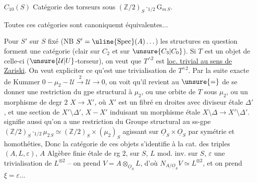 $C_{10}(S)$ Catégorie des torseurs sous $(\mathbb Z/2)_S\mathbin{\cdot}_{1/2}\mathrm G_{m\,S}$.

 Toutes ces catégories sont canoniquemt équivalentes...

 Pour $S'$ sur $S$ fixé (NB $S'=\uline{\operatorname{Spec}}(A)\ldots$) les structures en question forment une  catégorie (clair sur $C_2$ et sur $\unsure{C_3|C_0}$). Si $T$ est un objet de celle-ci ($\unsure{\mathcal U|U}$-torseur), on veut que $T^{\wedge 2}$ est \uline{loc. trivial au sens de Zariski}.
 On veut expliciter ce qu'est une trivialisation de $T^{\wedge 2}$. Par la suite exacte de Kummer $0-\mu_2-\mathcal U\xrightarrow{2}\mathcal U\longrightarrow 0$, on voit qu'il revient au $\unsure{=}$ de se donner une restriction du gpe structural à $\mu_2$, ou une orbite  de $T$ sous $\mu_2$, ou un morphisme de degr $2$ $X\longrightarrow X'$, où $X'$ est un fibré en droites avec diviseur  étale $\Delta'$, et une section  de $X'\setminus\Delta'$, $X-X'$ induisant un morphisme  étale
 $X\setminus\Delta\longrightarrow X'\setminus\Delta'$.  signifie aussi qu'on a une restriction du Groupe structural au ss-gpe $(\mathbb Z/2)_S\mathbin{\cdot}_{1/2}\mu_{2\,S}\simeq(\mathbb Z/2)_S\times(\mu_2)_S$ agissant sur $\underline O_S\times\underline O_S$ par symétrie et homothéties, Donc la catégorie de ces objets
 s'identifie à la cat. des triples $(A,L,\varepsilon)$, $A$ Algèbre finie étale de rg $2$, sur $S$, $L$ mod. inv. sur $S$, $\varepsilon$ une trivialisation de $L^{\otimes2}$ -- on prend $V=A\otimes_{\underline O_S}L$, d'où $N_{A/\underline O_S}V\simeq L^{\otimes2}$, et on prend $\xi=\varepsilon\ldots$

